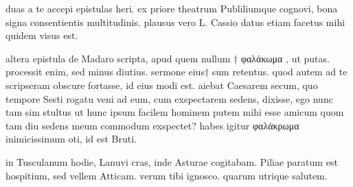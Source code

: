 


 duas a te accepi epistulas heri. ex priore theatrum Publiliumque cognovi, bona signa consentientis multitudinis. plausus vero L. Cassio datus etiam facetus mihi quidem visus est.

 altera epistula de Madaro scripta, apud quem nullum † φαλάκωμα , ut putas. processit enim, sed minus diutius. sermone eius† sum retentus. quod autem ad te scripseram obscure fortasse, id eius modi est. aiebat Caesarem secum, quo tempore Sesti rogatu veni ad eum, cum exspectarem sedens, dixisse, ego nunc tam sim stultus ut hunc ipsum facilem hominem putem mihi esse amicum quom tam diu sedens meum commodum exspectet? habes igitur φαλάκρωμα inimicissimum oti, id est Bruti.

 in Tusculanum hodie, Lanuvi cras, inde Asturae cogitabam. Piliae paratum est hospitium, sed vellem Atticam. verum tibi ignosco. quarum utrique salutem.
